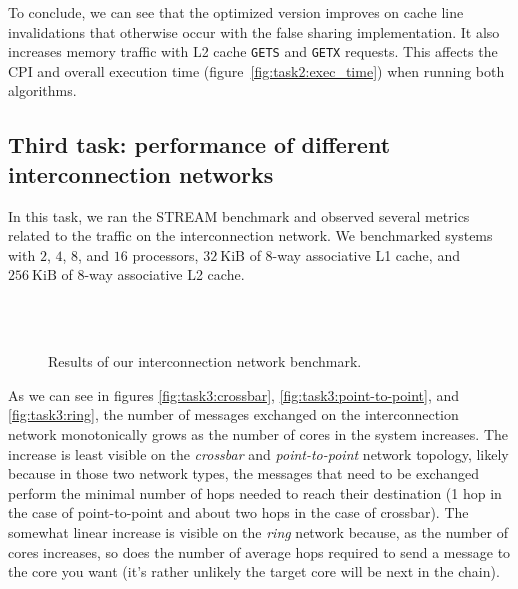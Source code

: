 \documentclass[10pt]{article}
\begin{document}
To conclude, we can see that the optimized version improves on cache line invalidations that otherwise occur with the false sharing implementation. It also increases memory traffic with L2 cache \texttt{GETS} and \texttt{GETX} requests. This affects the CPI and overall execution time (figure~\ref{fig:task2:exec_time}) when running both algorithms.



\subsection{Third task: performance of different interconnection networks}
In this task, we ran the STREAM benchmark and observed several metrics related to the traffic on the interconnection network. We benchmarked systems with $2$, $4$, $8$, and $16$ processors, $32~\text{KiB}$ of 8-way associative L1 cache, and $256~\text{KiB}$ of 8-way associative L2 cache.

\begin{figure}[htbp]
    \centering
    \hfill
    \\
    
    \hfill\\

    \caption{Results of our interconnection network benchmark.}
    \label{fig:task3}
\end{figure}

As we can see in figures \ref{fig:task3:crossbar}, \ref{fig:task3:point-to-point}, and \ref{fig:task3:ring}, the number of messages exchanged on the interconnection network monotonically grows as the number of cores in the system increases. The increase is least visible on the \textit{crossbar} and \textit{point-to-point} network topology, likely because in those two network types, the messages that need to be exchanged perform the minimal number of hops needed to reach their destination (1 hop in the case of point-to-point and about two hops in the case of crossbar). The somewhat linear increase is visible on the \textit{ring} network because, as the number of cores increases, so does the number of average hops required to send a message to the core you want (it's rather unlikely the target core will be next in the chain).


\end{document}

